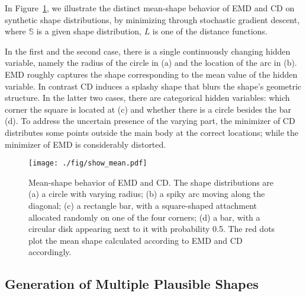 \documentclass[10pt,twocolumn,letterpaper]{article}
\newcommand{\cmt}[2]{[#1: #2]}
\newcommand{\todo}[1]{\cmt{{\bf TODO}}{{\bf \color{blue} #1}}}
\begin{document}
In Figure~\ref{fig:mean}, we illustrate the distinct mean-shape behavior of EMD and CD on synthetic shape distributions, by minimizing
through stochastic gradient descent, where $\mathbb{S}$ is a given shape distribution, $L$ is one of the distance functions. 

In the first and the second case, there is a single continuously changing hidden variable, namely the radius of the circle in (a) and the location of the arc in (b). EMD roughly captures the shape corresponding to the mean value of the hidden variable. In contrast CD induces a splashy shape that blurs the shape's geometric structure. In the latter two cases, there are categorical hidden variables: which corner the square is located at (c) and whether there is a circle besides the bar (d). To address the uncertain presence of the varying part, the minimizer of CD distributes some points outside the main body at the correct locations; while the minimizer of EMD is considerably distorted.

\begin{figure}[t!]
\centering
\texttt{[image: ./fig/show\_mean.pdf]}
\caption{Mean-shape behavior of EMD and CD. The shape distributions are (a) a circle with varying radius; (b) a spiky arc moving along the diagonal; (c) a rectangle bar, with a square-shaped attachment allocated randomly on one of the four corners; (d) a bar, with a circular disk appearing next to it with probability 0.5. The red dots plot the mean shape calculated according to EMD and CD accordingly.}
\label{fig:mean}
\end{figure}\subsection{Generation of Multiple Plausible Shapes}\label{sec:method:gan}%
\end{document}
